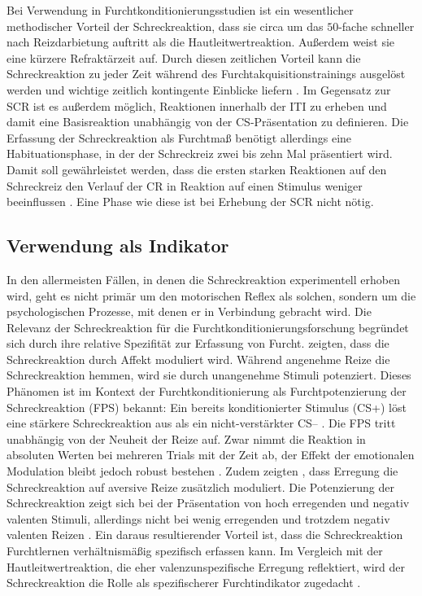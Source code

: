 		Bei Verwendung in Furchtkonditionierungsstudien ist ein wesentlicher methodischer Vorteil der Schreckreaktion, dass sie circa um das $50$-fache schneller nach Reizdarbietung auftritt als die Hautleitwertreaktion. %
		Außerdem weist sie eine kürzere Refraktärzeit auf. Durch diesen zeitlichen Vorteil kann die Schreckreaktion zu jeder Zeit während des Furchtakquisitionstrainings ausgelöst werden und wichtige zeitlich kontingente Einblicke liefern \parencite{LIPP2006}. Im Gegensatz zur SCR ist es außerdem möglich, Reaktionen innerhalb der ITI zu erheben und damit eine Basisreaktion unabhängig von der CS-Präsentation zu definieren. Die Erfassung der Schreckreaktion als Furchtmaß benötigt allerdings eine Habituationsphase, in der der Schreckreiz zwei bis zehn Mal präsentiert wird. Damit soll gewährleistet werden, dass die ersten starken Reaktionen auf den Schreckreiz den Verlauf der CR in Reaktion auf einen Stimulus weniger beeinflussen \parencite{BLUMENTHAL2005}. Eine Phase wie diese ist bei Erhebung der SCR nicht nötig. 
		
	\subsection{Verwendung als Indikator}				\label{startleinference}
		
		In den allermeisten Fällen, in denen die Schreckreaktion experimentell erhoben wird, geht es nicht primär um den motorischen Reflex als solchen, sondern um die psychologischen Prozesse, mit denen er in Verbindung gebracht wird. Die Relevanz der Schreckreaktion für die Furchtkonditionierungsforschung begründet sich durch ihre relative Spezifität zur Erfassung von Furcht. 
		\textcite{LANG1990} zeigten, dass die Schreckreaktion durch Affekt moduliert wird. Während angenehme Reize die Schreckreaktion hemmen, wird sie durch unangenehme Stimuli potenziert. Dieses Phänomen ist im Kontext der Furchtkonditionierung als Furchtpotenzierung der Schreckreaktion (FPS) bekannt: Ein bereits konditionierter Stimulus (CS+) löst eine stärkere Schreckreaktion aus als ein nicht-verstärkter CS-- \parencite{BROWN1951, HAMM1996, HAMM2005, BRADLEY2005}. Die FPS tritt unabhängig von der Neuheit der Reize auf. Zwar nimmt die Reaktion in absoluten Werten bei mehreren Trials mit der Zeit ab, der Effekt der emotionalen Modulation bleibt jedoch robust bestehen \parencite{BRADLEY2000}. Zudem zeigten \textcite{CUTHBERT1996}, dass Erregung die Schreckreaktion auf aversive Reize zusätzlich moduliert. Die Potenzierung der Schreckreaktion zeigt sich bei der Präsentation von hoch erregenden und negativ valenten Stimuli, allerdings nicht bei wenig erregenden und trotzdem negativ valenten Reizen \parencite{CUTHBERT1996}. Ein daraus resultierender Vorteil ist, dass die Schreckreaktion Furchtlernen verhältnismäßig spezifisch erfassen kann. Im Vergleich mit der Hautleitwertreaktion, die eher valenzunspezifische Erregung reflektiert, wird der Schreckreaktion die Rolle als spezifischerer Furchtindikator zugedacht \parencite{HAMM1996}. 
		
